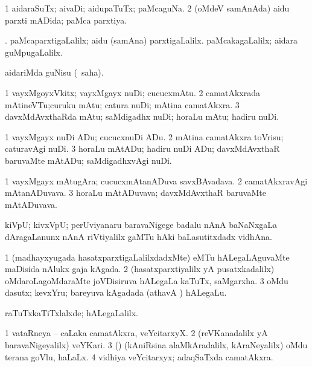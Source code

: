 \bentry
{}
\gl{\gu}
\bmng
\bnum
\num{1} aidaraSuTx; aivaDi; aidupaTuTx; paMcaguNa. 
\num{2} (oMdeV samAnAda) aidu parxti mADida; paMca parxtiya. 
\enum
\emng

\noindent
\gl{\pagu}
\expl{}
\bmng
{}. 
\banum
{} paMcaparxtigaLalilx; aidu (samAna) parxtigaLalilx. 
 paMcakagaLalilx; aidara guMpugaLalilx. 
\eanum
\emng
\eentry

\bentry
{}
\gl{\sakirx}
\expl{}
\bmng
aidariMda guNisu (\akirx\ saha). 
\emng
\eentry

\bentry
{}
\gl{\nA }
\bmng
\bnum
\num{1} vayxMgoyxVkitx; vayxMgayx nuDi; cucucxmAtu. 
\num{2} camatAkxrada mAtineVTu;curuku mAtu; catura nuDi; mAtina camatAkxra. 
\num{3} davxMdAvxthaRda mAtu; saMdigadhx nuDi; horaLu mAtu; hadiru nuDi. 
\enum
\emng
\eentry

\bentry
{}
\gl{\akirx}
\bmng
\bnum
\num{1} vayxMgayx nuDi ADu; cucucxnuDi ADu. 
\num{2} mAtina camatAkxra toVrisu; caturavAgi nuDi. 
\num{3} horaLu mAtADu; hadiru nuDi ADu; davxMdAvxthaR baruvaMte mAtADu; saMdigadhxvAgi nuDi. 
\enum
\emng
\eentry

\bentry
{}
\gl{\nA}
\bmng
\bnum
\num{1} vayxMgayx mAtugAra; cucucxmAtanADuva savxBAvadava. 
\num{2} camatAkxravAgi mAtanADuvava. 
\num{3} horaLu mAtADuvava; davxMdAvxthaR baruvaMte mAtADuvava. 
\enum
\emng
\eentry

\bentry
{}
\gl{\nA}
\bmng
kiVpU; kivxVpU; perUviyanaru baravaNigege badalu nAnA baNaNxgaLa dAragaLanunx nAnA riVtiyalilx gaMTu hAki baLasutitxdadx vidhAna. 
\emng
\eentry

\bentry
{}
\gl{\nA}
\bmng
\bnum
\num{1} (madhayxyugada hasatxparxtigaLalilxdadxMte) eMTu hALegaLAguvaMte maDisida nAlukx gaja kAgada. 
\num{2} (hasatxparxtiyalilx yA pusatxkadalilx) oMdaroLagoMdaraMte joVDisiruva hALegaLa kaTuTx, saMgarxha. 
\num{3} oMdu dasutx; kevxYru; bareyuva kAgadada  (athavA ) hALegaLu. 
\enum
\emng

\noindent
\gl{\pagu}
\bmng
{} raTuTxkaTiTxlalxde; hALegaLalilx. 
\emng
\eentry

\bentry
{}
\gl{\nA}
\bmng
\bnum
\num{1} vataRneya -- caLaka camatAkxra, veYcitarxyX. 
\num{2} (reVKanadalilx yA baravaNigeyalilx) veYKari. 
\num{3} (\vAshi) (kAniRsina alaMkAradalilx, kAraNeyalilx) oMdu terana goVlu, haLaLx. 
\num{4} vidhiya veYcitarxyx; adaqSaTxda camatAkxra. 
\enum
\emng
\eentry

